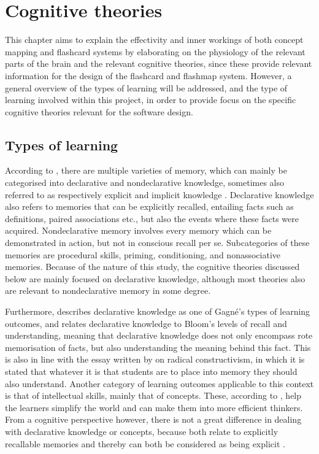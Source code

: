 \chapter{Cognitive theories}

\label{ch:theory}

This chapter aims to explain the effectivity and inner workings of both concept mapping and flashcard systems by elaborating on the physiology of the relevant parts of the brain and the relevant cognitive theories, since these provide relevant information for the design of the flashcard and flashmap system. However, a general overview of the types of learning will be addressed, and the type of learning involved within this project, in order to provide focus on the specific cognitive theories relevant for the software design.

\section{Types of learning}

According to , there are multiple varieties of memory, which can mainly be categorised into declarative and nondeclarative knowledge, sometimes also referred to as respectively explicit and implicit knowledge \cite{cognitivepsychology}. Declarative knowledge also refers to memories that can be explicitly recalled, entailing facts such as definitions, paired associations etc., but also the events where these facts were acquired. Nondeclarative memory involves every memory which can be demonstrated in action, but not in conscious recall per se. Subcategories of these memories are procedural skills, priming, conditioning, and nonassociative memories. Because of the nature of this study, the cognitive theories discussed below are mainly focused on declarative knowledge, although most theories also are relevant to nondeclarative memory in some degree.

Furthermore,  describes declarative knowledge as one of Gagné's types of learning outcomes, and relates declarative knowledge to Bloom's levels of recall and understanding, meaning that declarative knowledge does not only encompass rote memorisation of facts, but also understanding the meaning behind this fact. This is also in line with the essay written by  on radical constructivism, in which it is stated that whatever it is that students are to place into memory they should also understand. Another category of learning outcomes applicable to this context is that of intellectual skills, mainly that of concepts. These, according to , help the learners simplify the world and can make them into more efficient thinkers. From a cognitive perspective however, there is not a great difference in dealing with declarative knowledge or concepts, because both relate to explicitly recallable memories and thereby can both be considered as being explicit \cite{squire}.

